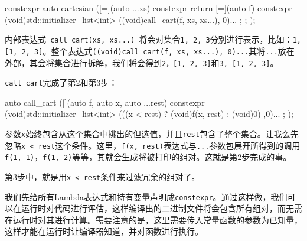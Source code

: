 \begin{codebox}[cpp]
constexpr auto cartesian ([=](auto ...xs) constexpr {
    return [=](auto f) constexpr {
        (void)std::initializer_list<int>{
            ((void)call_cart(f, xs, xs...), 0)...
        };
    };
}); 
\end{codebox}

内部表达式\texttt{ call\_cart(xs, xs...) }将会对集合\texttt{1, 2, 3}分别进行表示，比如：\texttt{1, [1, 2, 3]}。整个表达式\texttt{((void)call\_cart(f, xs, xs...), 0)...}其将\texttt{...}放在外部，其会将集合进行拆解，我们将会得到\texttt{2，[1, 2, 3]}和\texttt{3, [1, 2, 3]}。

\texttt{call\_cart}完成了第2和第3步：

\begin{codebox}[cpp]
auto call_cart ([](auto f, auto x, auto ...rest) constexpr {
    (void)std::initializer_list<int>{
        (((x < rest)
            ? (void)f(x, rest)
            : (void)0)
        ,0)...
    };
});
\end{codebox}

参数\texttt{x}始终包含从这个集合中挑出的但选值，并且\texttt{rest}包含了整个集合。让我么先忽略\texttt{x < rest}这个条件。这里，\texttt{f(x, rest)}表达式与\texttt{...}参数包展开所得到的调用\texttt{f(1, 1)}，\texttt{f(1, 2)}等等，其就会生成将被打印的组对。这就是第2步完成的事。

第3步中，就是用\texttt{x < rest}条件来过滤冗余的组对了。

我们先给所有Lambda表达式和持有变量声明成\texttt{constexpr}。通过这样做，我们可以在运行时对代码进行评估，这样编译出的二进制文件将会包含所有组对，而无需在运行时对其进行计算。需要注意的是，这里需要传入常量函数的参数为已知量，这样才能在运行时让编译器知道，并对函数进行执行。


